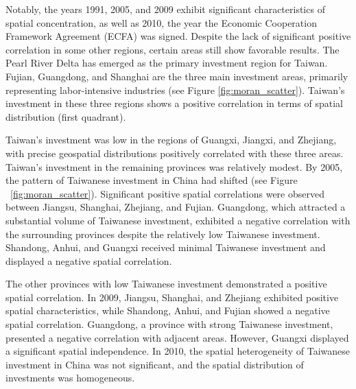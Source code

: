 \documentclass{article}
\begin{document}
Notably, the years 1991, 2005, and 2009 exhibit significant characteristics of
spatial concentration, as well as 2010, the year the Economic Cooperation Framework
Agreement (ECFA) was signed. Despite the lack of significant positive correlation in some
other regions, certain areas still show favorable results. The Pearl River Delta has
emerged as the primary investment region for Taiwan. Fujian, Guangdong, and Shanghai
are the three main investment areas, primarily representing labor-intensive industries (see Figure \ref{fig:moran_scatter}). Taiwan's investment in these three regions shows a positive correlation in terms of spatial distribution (first quadrant). 


\vspace{4.7cm}

Taiwan's investment was low in the regions of Guangxi, Jiangxi, and Zhejiang, with precise geospatial distributions positively correlated with these three areas. Taiwan's investment in the remaining provinces was relatively modest. By 2005, the pattern of Taiwanese investment in China had shifted (see Figure ~\ref{fig:moran_scatter}). Significant positive spatial correlations were observed between Jiangsu, Shanghai, Zhejiang, and Fujian. Guangdong, which attracted a substantial volume of Taiwanese investment, exhibited a negative correlation with the surrounding provinces despite the relatively low Taiwanese investment. Shandong, Anhui, and Guangxi received minimal Taiwanese investment and displayed a negative spatial correlation.

The other provinces with low Taiwanese investment demonstrated a positive spatial correlation. In 2009, Jiangsu, Shanghai, and Zhejiang exhibited positive spatial characteristics, while Shandong, Anhui, and Fujian showed a negative spatial correlation. Guangdong, a province with strong Taiwanese investment, presented a negative correlation with adjacent areas. However, Guangxi displayed a significant spatial independence. In 2010, the spatial heterogeneity of Taiwanese investment in China was not significant, and the spatial distribution of investments was homogeneous.
\end{document}
